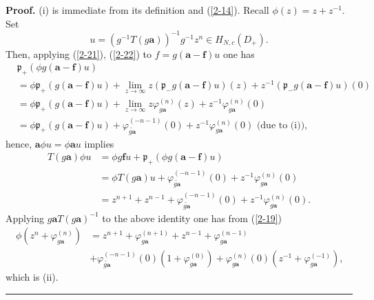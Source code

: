 \documentclass[a4paper]{article}%
\newenvironment{proof}[1][Proof]{\noindent\textbf{#1.} }{\ \rule{0.5em}{0.5em}}
\begin{document}
\begin{proof}
(i) is immediate from its definition and (\ref{2-14}). Recall $\phi\left(
z\right)  =z+z^{-1}$. Set%
\[
u=\left(  g^{-1}T\left(  g\boldsymbol{a}\right)  \right)  ^{-1}g^{-1}z^{n}\in
H_{N,c}\left(  D_{+}\right)  \text{.}%
\]
Then, applying (\ref{2-21}), (\ref{2-22}) to $f=g\left(  \boldsymbol{a}%
-\boldsymbol{f}\right)  u$ one has
\begin{align*}
&  \mathfrak{p}_{+}\left(  \phi g\left(  \boldsymbol{a}-\boldsymbol{f}\right)
u\right) \\
&  =\phi\mathfrak{p}_{+}\left(  g\left(  \boldsymbol{a}-\boldsymbol{f}\right)
u\right)  +\lim_{z\rightarrow\infty}z\left(  \mathfrak{p}_{-}g\left(
\boldsymbol{a}-\boldsymbol{f}\right)  u\right)  \left(  z\right)
+z^{-1}\left(  \mathfrak{p}_{-}g\left(  \boldsymbol{a}-\boldsymbol{f}\right)
u\right)  \left(  0\right) \\
&  =\phi\mathfrak{p}_{+}\left(  g\left(  \boldsymbol{a}-\boldsymbol{f}\right)
u\right)  +\lim_{z\rightarrow\infty}z\varphi_{g\boldsymbol{a}}^{\left(
n\right)  }\left(  z\right)  +z^{-1}\varphi_{g\boldsymbol{a}}^{\left(
n\right)  }\left(  0\right) \\
&  =\phi\mathfrak{p}_{+}\left(  g\left(  \boldsymbol{a}-\boldsymbol{f}\right)
u\right)  +\varphi_{\widetilde{g\boldsymbol{a}}}^{\left(  -n-1\right)
}\left(  0\right)  +z^{-1}\varphi_{g\boldsymbol{a}}^{\left(  n\right)
}\left(  0\right)  \text{ \ (due to (i)),}%
\end{align*}
hence, $\boldsymbol{a}\phi u=\phi\boldsymbol{a}u$ implies%
\begin{align*}
T\left(  g\boldsymbol{a}\right)  \phi u  &  =\phi g\boldsymbol{f}%
u+\mathfrak{p}_{+}\left(  \phi g\left(  \boldsymbol{a}-\boldsymbol{f}\right)
u\right) \\
&  =\phi T\left(  g\boldsymbol{a}\right)  u+\varphi_{\widetilde
{g\boldsymbol{a}}}^{\left(  -n-1\right)  }\left(  0\right)  +z^{-1}%
\varphi_{g\boldsymbol{a}}^{\left(  n\right)  }\left(  0\right) \\
&  =z^{n+1}+z^{n-1}+\varphi_{\widetilde{g\boldsymbol{a}}}^{\left(
-n-1\right)  }\left(  0\right)  +z^{-1}\varphi_{g\boldsymbol{a}}^{\left(
n\right)  }\left(  0\right)  \text{.}%
\end{align*}
Applying $g\boldsymbol{a}T\left(  g\boldsymbol{a}\right)  ^{-1}$ to the above
identity one has from (\ref{2-19})
\begin{align*}
\phi\left(  z^{n}+\varphi_{g\boldsymbol{a}}^{\left(  n\right)  }\right)   &
=z^{n+1}+\varphi_{g\boldsymbol{a}}^{\left(  n+1\right)  }+z^{n-1}%
+\varphi_{g\boldsymbol{a}}^{\left(  n-1\right)  }\\
&  +\varphi_{\widetilde{g\boldsymbol{a}}}^{\left(  -n-1\right)  }\left(
0\right)  \left(  1+\varphi_{g\boldsymbol{a}}^{\left(  0\right)  }\right)
+\varphi_{g\boldsymbol{a}}^{\left(  n\right)  }\left(  0\right)  \left(
z^{-1}+\varphi_{g\boldsymbol{a}}^{\left(  -1\right)  }\right)  \text{,}%
\end{align*}
which is (ii).\bigskip
\end{proof}
\end{document}
